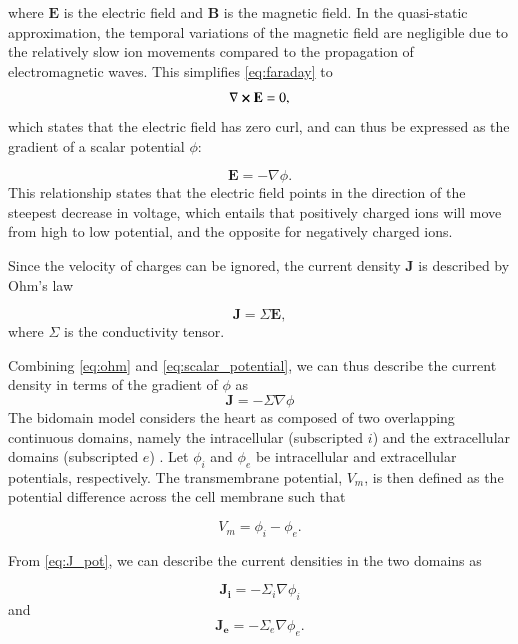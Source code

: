 where $\mathbf{E}$ is the electric field and $\mathbf{B}$ is the magnetic field.
In the quasi-static approximation, the temporal variations of the magnetic field are negligible due to the relatively slow ion movements compared to the propagation of electromagnetic waves. This simplifies \eqref{eq:faraday} to 
\begin{equation}
    \nabla\cross\mathbf{E}=0,
\end{equation}
which states that the electric field has zero curl, and can thus be expressed as the gradient of a scalar potential $\phi$:

\begin{equation}
    \mathbf{E}=-\nabla \phi.
    \label{eq:scalar_potential}
\end{equation}
This relationship states that the electric field points in the direction of the steepest decrease in voltage, which entails that positively charged ions will move from high to low potential, and the opposite for negatively charged ions.

Since the velocity of charges can be ignored, the current density $\mathbf{J}$ is described by Ohm's law

\begin{equation}
    \mathbf{J}=\Sigma \mathbf{E },
    \label{eq:ohm}
\end{equation}
where $\Sigma$ is the conductivity tensor.

Combining \eqref{eq:ohm} and \eqref{eq:scalar_potential}, we can thus describe the current density in terms of the gradient of $\phi$ as  
\begin{equation}
    \mathbf{J}= -\Sigma \nabla \phi
    \label{eq:J_pot}
\end{equation}
The bidomain model considers the heart as composed of two overlapping continuous domains, namely the intracellular (subscripted $i$) and the extracellular domains (subscripted $e$) \cite{Tung_bidomain}. Let $\phi_i$ and $\phi_e$ be intracellular and extracellular potentials, respectively. The transmembrane potential, $V_m$, is then defined as the potential difference across the cell membrane such that

\begin{equation}
    V_m= \phi_i -\phi_e.
    \label{eq:Vm}
\end{equation}

From \eqref{eq:J_pot}, we can describe the current densities in the two domains as

\begin{equation}
    \mathbf{J_i}= -\Sigma_i \nabla \phi_i
    \label{eq:J_i}
\end{equation}
and
\begin{equation}
    \mathbf{J_e}= -\Sigma_e \nabla \phi_e.
    \label{eq:J_e}
\end{equation}

